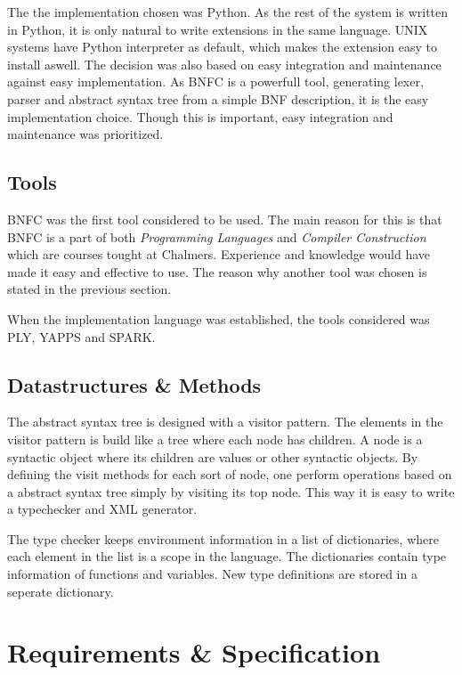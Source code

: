 The the implementation chosen was Python. As the rest of the system is
written in Python, it is only natural to write extensions in the same
language. UNIX systems have Python interpreter as default, which makes
the extension easy to install aswell. The decision was also based on
easy integration and maintenance against easy implementation. As BNFC
is a powerfull tool, generating lexer, parser and abstract syntax tree
from a simple BNF description, it is the easy implementation
choice. Though this is important, easy integration and maintenance was
prioritized.


\subsection{Tools}
BNFC was the first tool considered to be used. The main reason for
this is that BNFC is a part of both \emph{Programming Languages} and
\emph{Compiler Construction} which are courses tought at
Chalmers. Experience and knowledge would have made it easy and
effective to use. The reason why another tool was chosen is stated in
the previous section.

When the implementation language was established, the tools considered
was PLY, YAPPS and SPARK\citep{ply:online,yapps:online,spark:online}.



\subsection{Datastructures \& Methods}
The abstract syntax tree is designed with a visitor pattern. The
elements in the visitor pattern is build like a tree where each node
has children. A node is a syntactic object where its children are
values or other syntactic objects. By defining the visit methods for
each sort of node, one perform operations based on a abstract syntax
tree simply by visiting its top node. This way it is easy to write a
typechecker and XML generator.

The type checker keeps environment information in a list of
dictionaries, where each element in the list is a scope in the
language. The dictionaries contain type information of functions and
variables. New type definitions are stored in a seperate dictionary.


\section{Requirements \& Specification}

